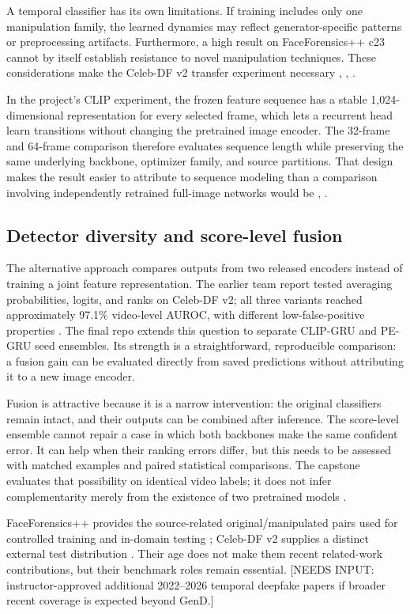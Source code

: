 \documentclass[conference,10pt]{IEEEtran}
\begin{document}
A temporal classifier has its own limitations. If training includes only one manipulation family, the learned dynamics may reflect generator-specific patterns or preprocessing artifacts. Furthermore, a high result on FaceForensics++ c23 cannot by itself establish resistance to novel manipulation techniques. These considerations make the Celeb-DF v2 transfer experiment necessary \cite{rossler2019}, \cite{li2020}, \cite{capstone2026}.

In the project’s CLIP experiment, the frozen feature sequence has a stable 1,024-dimensional representation for every selected frame, which lets a recurrent head learn transitions without changing the pretrained image encoder. The 32-frame and 64-frame comparison therefore evaluates sequence length while preserving the same underlying backbone, optimizer family, and source partitions. That design makes the result easier to attribute to sequence modeling than a comparison involving independently retrained full-image networks would be \cite{cho2014}, \cite{capstone2026}.

\subsection{Detector diversity and score-level fusion}
The alternative approach compares outputs from two released encoders instead of training a joint feature representation. The earlier team report tested averaging probabilities, logits, and ranks on Celeb-DF v2; all three variants reached approximately 97.1\% video-level AUROC, with different low-false-positive properties \cite{capstone2026}. The final repo extends this question to separate CLIP-GRU and PE-GRU seed ensembles. Its strength is a straightforward, reproducible comparison: a fusion gain can be evaluated directly from saved predictions without attributing it to a new image encoder.

Fusion is attractive because it is a narrow intervention: the original classifiers remain intact, and their outputs can be combined after inference. The score-level ensemble cannot repair a case in which both backbones make the same confident error. It can help when their ranking errors differ, but this needs to be assessed with matched examples and paired statistical comparisons. The capstone evaluates that possibility on identical video labels; it does not infer complementarity merely from the existence of two pretrained models \cite{capstone2026}.

FaceForensics++ provides the source-related original/manipulated pairs used for controlled training and in-domain testing \cite{rossler2019}; Celeb-DF v2 supplies a distinct external test distribution \cite{li2020}. Their age does not make them recent related-work contributions, but their benchmark roles remain essential. [NEEDS INPUT: instructor-approved additional 2022–2026 temporal deepfake papers if broader recent coverage is expected beyond GenD.]
\end{document}
